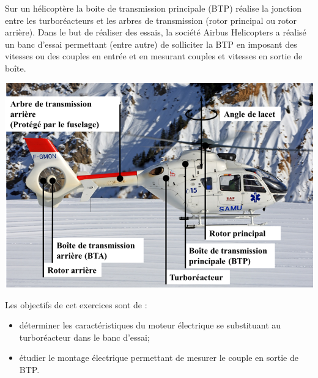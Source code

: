 \documentclass[10pt,fleqn]{article} %
\begin{document}

\vspace{7.5cm}
\pagestyle{fancy}
\thispagestyle{plain}


\def\columnseprulecolor{\color{ocre}}
\setlength{\columnseprule}{0.4pt} 
\ifprof
\else
\begin{multicols}{2}
\fi

Sur un hélicoptère la boite de transmission principale (BTP) réalise la jonction entre les turboréacteurs et les arbres de transmission (rotor principal ou rotor arrière). Dans le but de réaliser des essais, la société Airbus Helicopters a réalisé un banc d'essai permettant (entre autre) de solliciter la BTP en imposant des vitesses ou des couples en entrée et en mesurant couples et vitesses en sortie de boîte.

\begin{center}
\includegraphics[width=.9\linewidth]{images/btp}
\end{center}

\begin{obj} 
Les objectifs de cet exercices sont de :
\begin{itemize}
\item déterminer les caractéristiques du moteur électrique se substituant au turboréacteur dans le banc d'essai;
\item étudier le montage électrique permettant de mesurer le couple en sortie de BTP. 
\end{itemize}
\end{obj}


\end{multicols}
\end{document}
